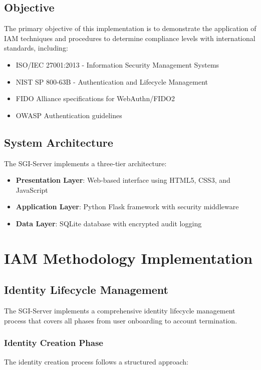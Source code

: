 \documentclass[12pt,a4paper]{article}
\begin{document}
\subsection{Objective}
The primary objective of this implementation is to demonstrate the application of IAM techniques and procedures to determine compliance levels with international standards, including:
\begin{itemize}
    \item ISO/IEC 27001:2013 - Information Security Management Systems
    \item NIST SP 800-63B - Authentication and Lifecycle Management
    \item FIDO Alliance specifications for WebAuthn/FIDO2
    \item OWASP Authentication guidelines
\end{itemize}

\subsection{System Architecture}
The SGI-Server implements a three-tier architecture:
\begin{itemize}
    \item \textbf{Presentation Layer}: Web-based interface using HTML5, CSS3, and JavaScript
    \item \textbf{Application Layer}: Python Flask framework with security middleware
    \item \textbf{Data Layer}: SQLite database with encrypted audit logging
\end{itemize}

\section{IAM Methodology Implementation}

\subsection{Identity Lifecycle Management}
The SGI-Server implements a comprehensive identity lifecycle management process that covers all phases from user onboarding to account termination.

\subsubsection{Identity Creation Phase}
The identity creation process follows a structured approach:
\end{document}
